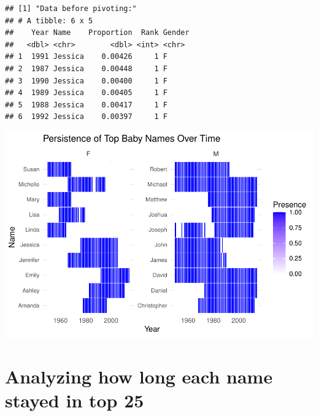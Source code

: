 \documentclass[11pt,preprint, authoryear]{elsarticle}
\let\origfigure\figure
\let\endorigfigure\endfigure
\renewenvironment{figure}[1][2] {
    \expandafter\origfigure\expandafter[H]
} {
    \endorigfigure
}
\numberwithin{equation}{section}
\numberwithin{figure}{section}
\numberwithin{table}{section}
\begin{document}
\begin{verbatim}
## [1] "Data before pivoting:"
## # A tibble: 6 x 5
##    Year Name    Proportion  Rank Gender
##   <dbl> <chr>        <dbl> <int> <chr> 
## 1  1991 Jessica    0.00426     1 F     
## 2  1987 Jessica    0.00448     1 F     
## 3  1990 Jessica    0.00400     1 F     
## 4  1989 Jessica    0.00405     1 F     
## 5  1988 Jessica    0.00417     1 F     
## 6  1992 Jessica    0.00397     1 F
\end{verbatim}

\begin{figure}

{\centering \includegraphics{README_files/figure-latex/unnamed-chunk-3-1} 

}

\caption{The Proportion of the Top 25 Baby Names and their Persistence Over Time for both Genders\label{Figure3}}\label{fig:unnamed-chunk-3}
\end{figure}

\hypertarget{analyzing-how-long-each-name-stayed-in-top-25}{%
\section{Analyzing how long each name stayed in top
25}\label{analyzing-how-long-each-name-stayed-in-top-25}}
\end{document}
